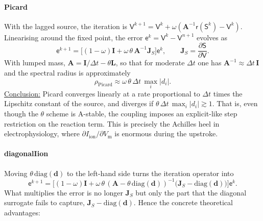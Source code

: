 \documentclass[11pt,a4paper]{article}
\newcommand{\Vm}{V_{\text{m}}}
\newcommand{\Iion}{I_{\mathrm{ion}}}
\newcommand{\Lop}{\mathbf{L}}
\newcommand{\Aimp}{\mathbf{A}}
\begin{document}
\paragraph{Picard} With the lagged source, the iteration is
$\mathsf{V}^{k+1}=\mathsf{V}^k+\omega(\Aimp^{-1}\mathsf{r}(\mathsf{S}^k)-\mathsf{V}^k)$.
Linearising around the fixed point, the error
$\mathsf{e}^k=\mathsf{V}^k-\mathsf{V}^{n+1}$ evolves as
$$
\mathsf{e}^{k+1}=\big[(1-\omega)\mathbf{I}+\omega\,\theta\,\Aimp^{-1}\mathbf{J}_S\big]\mathsf{e}^k,\qquad \mathbf{J}_S=\frac{\partial\mathsf{S}}{\partial\mathsf{V}}.
$$
With lumped mass, $\Aimp=\mathbf{I}/\Delta t-\theta\Lop$, so that for moderate
$\Delta t$ one has $\Aimp^{-1}\approx\Delta t\,\mathbf{I}$ and the spectral
radius is approximately
$$
\rho_{\text{Picard}}\approx\omega\,\theta\,\Delta t\,\max_i|d_i| .
$$
\underline{Conclusion:} Picard converges linearly
at a rate proportional to $\Delta t$ times the Lipschitz constant of the source,
and diverges if $\theta\,\Delta t\,\max_i|d_i|\gtrsim1$. That is, even though
the $\theta$ scheme is A-stable, the coupling imposes an explicit-like step
restriction on the reaction term. This is precisely the Achilles heel in
electrophysiology, where $\partial\Iion/\partial\Vm$ is enormous during the
upstroke.

\paragraph{diagonalIion} Moving $\theta\,\mathrm{diag}(\mathbf{d})$ to the left-hand side turns the
iteration operator into
$$
\mathsf{e}^{k+1}=\big[(1-\omega)\mathbf{I}+\omega\,\theta\,(\Aimp-\theta\,\mathrm{diag}(\mathbf{d}))^{-1}\big(\mathbf{J}_S-\mathrm{diag}(\mathbf{d})\big)\big]\mathsf{e}^k .
$$
What multiplies the error is no longer $\mathbf{J}_S$ but only the part that the
diagonal surrogate fails to capture, $\mathbf{J}_S-\mathrm{diag}(\mathbf{d})$.
Hence the concrete theoretical advantages:
\end{document}

